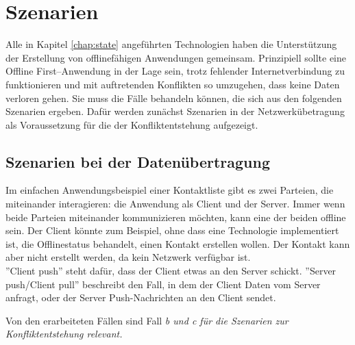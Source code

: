 \chapter{\label{chap:szenarien}Szenarien}
Alle in Kapitel \ref{chap:state} angeführten Technologien haben die Unterstützung der Erstellung von offlinefähigen Anwendungen gemeinsam.
Prinzipiell sollte eine Offline First--Anwendung in der Lage sein, trotz fehlender Internetverbindung zu funktionieren und mit auftretenden Konflikten so umzugehen, dass keine Daten verloren gehen.
Sie muss die Fälle behandeln können, die sich aus den folgenden Szenarien ergeben.
Dafür werden zunächst Szenarien in der Netzwerkübetragung als Voraussetzung für die der Konfliktentstehung aufgezeigt.
%
%
\section{\label{chap:netszenarien}Szenarien bei der Datenübertragung}
Im einfachen Anwendungsbeispiel einer Kontaktliste gibt es zwei Parteien, die miteinander interagieren: die Anwendung als Client und der Server. Immer wenn beide Parteien miteinander kommunizieren möchten, kann eine der beiden offline sein.
Der Client könnte zum Beispiel, ohne dass eine Technologie implementiert ist, die Offlinestatus behandelt, einen Kontakt erstellen wollen. Der Kontakt kann aber nicht erstellt werden, da kein Netzwerk verfügbar ist.\\
''Client push'' steht dafür, dass der Client etwas an den Server schickt.
''Server push/Client pull'' beschreibt den Fall, in dem der Client Daten vom Server anfragt, oder der Server Push-Nachrichten an den Client sendet.
%

Von den erarbeiteten Fällen sind Fall \it{b} und \it{c} für die Szenarien zur Konfliktentstehung relevant.
%
%
%

